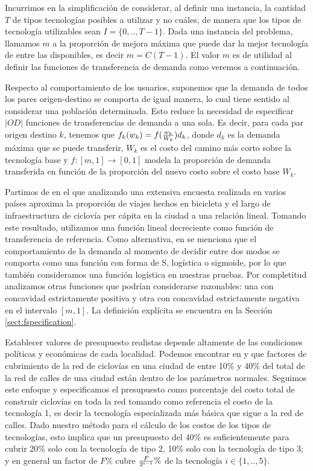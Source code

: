 Incurrimos en la simplificación de considerar, al definir una instancia, la cantidad $T$ de tipos tecnologías posibles a utilizar y no cuáles, de manera que los tipos de tecnología utilizables sean $I = \{0,.., T - 1\}$. Dada una instancia del problema, llamamos $m$ a la proporción de mejora máxima que puede dar la mejor tecnología de entre las disponibles, es decir $m = C(T - 1)$. El valor $m$ es de utilidad al definir las funciones de transferencia de demanda como veremos a continuación.

Respecto al comportamiento de los usuarios, suponemos que la demanda de todos los pares origen-destino se comporta de igual manera, lo cual tiene sentido al considerar una población determinada. Esto reduce la necesidad de especificar $|OD|$ funciones de transferencias de demanda a una sola. Es decir, para cada par origen destino $k$, tenemos que $f_k(w_k) = f({w_k \over W_k})d_k$, donde $d_k$ es la demanda máxima que se puede transferir, $W_k$ es el costo del camino más corto sobre la tecnología base y $f: [m, 1] \rightarrow [0, 1]$ modela la proporción de demanda transferida en función de la proporción del nuevo costo sobre el costo base $W_k$.

Partimos de \textcite{shwe2014} en el que analizando una extensiva encuesta realizada en varios países aproxima la proporción de viajes hechos en bicicleta y el largo de infraestructura de ciclovía per cápita en la ciudad a una relación lineal. Tomando este resultado, utilizamos una función lineal decreciente como función de transferencia de referencia. Como alternativa, en \textcite{ortuz2011} se menciona que el comportamiento de la demanda al momento de decidir entre dos modos se comporta como una función con forma de S, logística o sigmoide, por lo que también consideramos una función logística en nuestras pruebas. Por completitud analizamos otras funciones que podrían considerarse razonables: una con concavidad estrictamente positiva y otra con concavidad estrictamente negativa en el intervalo $[m, 1]$. La definición explícita se encuentra en la Sección \ref{sect:fspecification}.

Establecer valores de presupuesto realistas depende altamente de las condiciones políticas y económicas de cada localidad. Podemos encontrar en \textcite{rios2015} y \textcite{shwe2014} que factores de cubrimiento de la red de ciclovías en una ciudad de entre 10\% y 40\% del total de la red de calles de una ciudad están dentro de los parámetros normales. Seguimos este enfoque y especificamos el presupuesto como porcentaje del costo total de construir ciclovías en toda la red tomando como referencia el costo de la tecnología 1, es decir la tecnología especializada más básica que sigue a la red de calles. Dado nuestro método para el cálculo de los costos de los tipos de tecnologías, esto implica que un presupuesto del 40\% es suficientemente para cubrir 20\% solo con la tecnología de tipo 2, 10\% solo con la tecnología de tipo 3; y en general un factor de $F\%$ cubre ${F \over {2^{i - 1}}}\%$ de la tecnología $i \in \{1,..,5\}$.

